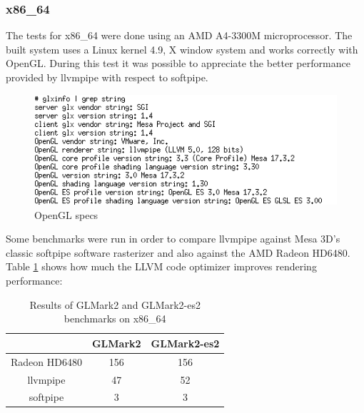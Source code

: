 \documentclass[12pt,a4paper,oneside]{article}
\begin{document}
\subsubsection*{x86\_64}
The tests for x86\_64 were done using an AMD A4-3300M microprocessor. The built
system uses a Linux kernel 4.9, X window system and works correctly with OpenGL.
During this test it was possible to appreciate the better performance provided by
llvmpipe with respect to softpipe.
\begin{figure}[H]
\centering
  \includegraphics[scale=0.75]{img/llvmpipe-glspecs.png}
  \caption{OpenGL specs}
  \label{fig:llvmpipe-glspecs}
\end{figure}
Some benchmarks were run in order to compare llvmpipe against Mesa 3D's classic
softpipe software rasterizer and also against the AMD Radeon HD6480.
Table \ref{tab:glmark2_x86} shows how much the LLVM code optimizer improves
rendering performance:
\begin{table}[h!]
  \begin{center}
    \caption{Results of GLMark2 and GLMark2-es2 benchmarks on x86\_64}
    \label{tab:glmark2_x86}
    \begin{tabular}{ c |c c }
    & {GLMark2} & {GLMark2-es2} \\
    \hline
    Radeon HD6480 & 156 & 156 \\
    llvmpipe & 47 & 52 \\
    softpipe & 3 & 3 \\
    \end{tabular}
  \end{center}
\end{table}

\newpage
\end{document}
